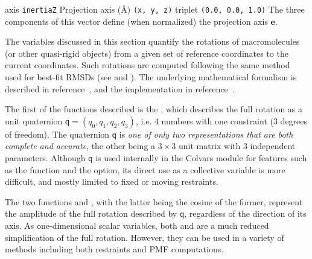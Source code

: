 \begin{cvcoptions}
\item %
\item %
  \keydef
    {axis}{%
    \texttt{inertiaZ}}{%
    Projection axis (\AA{})}{%
    \texttt{(x, y, z)} triplet}{%
    \texttt{(0.0, 0.0, 1.0)}}{%
    The three components of this vector define (when normalized) the
    projection axis $\mathbf{e}$.}
\end{cvcoptions}



The variables discussed in this section quantify the rotations of macromolecules (or other quasi-rigid objects) from a given set of reference coordinates to the current coordinates.
Such rotations are computed following the same method used for best-fit RMSDs (see  and ).
The underlying mathematical formalism is described in reference~\cite{Coutsias2004}, and the implementation in reference~\cite{Fiorin2013}.

The first of the functions described is the , which describes the full rotation as a unit quaternion $\mathsf{q} = (q_0, q_1, q_2, q_3)$, i.e.{} 4 numbers with one constraint (3 degrees of freedom).
The quaternion $\mathsf{q}$ is \emph{one of only two representations that are both complete and accurate}, the other being a $3\times{}3$ unit matrix with 3 independent parameters.
Although $\mathsf{q}$ is used internally in the Colvars module for features such as the  function and the  option, its direct use as a collective variable is more difficult, and mostly limited to fixed or moving restraints.

The two functions  and , with the latter being the cosine of the former, represent the amplitude of the full rotation described by $\mathsf{q}$, regardless of the direction of its axis.
As one-dimensional scalar variables, both  and  are a much reduced simplification of the full rotation.
However, they can be used in a variety of methods including both restraints and PMF computations.

